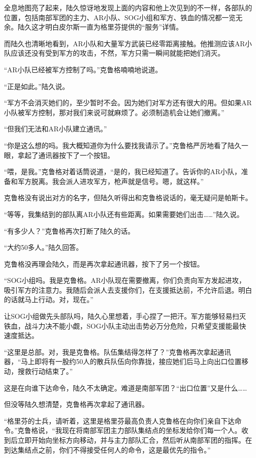全息地图亮了起来，陆久惊讶地发现上面的内容和他上次见到的不一样，各部队的位置，包括南部军团的主力、AR小队、SOG小组和军方、铁血的情况都一览无余。陆久这才明白皮尔斯一直为格里芬提供的“服务”详情。

而陆久也清晰地看到，AR小队和大量军方武装已经零距离接触。他推测应该AR小队应该还没有受到军方的攻击，不然，军方只需一瞬间就能把她们消灭。

“AR小队已经被军方控制了吗。”克鲁格喃喃地说道。

“正是如此。”陆久说。

“军方不会消灭她们的，至少暂时不会。因为她们对军方还有很大的用。但如果AR小队被军方控制，那对我们来说可就麻烦了。必须制造机会让她们撤离。”

“但我们无法和AR小队建立通讯。”

“你是这么想的吗。我大概知道你为什么要找我请示了。”克鲁格严厉地看了陆久一眼，拿起了通讯器按下了一个按钮。

“喂，是我。”克鲁格对着话筒说道，“是的，我已经知道了。告诉你的AR小队，准备和军方脱离。我会派人进攻军方，枪声就是信号。嗯，就这样。”

克鲁格没有说出对方的名字，但陆久听得出和克鲁格说话的，毫无疑问是帕斯卡。

“等等，我集结到的部队离AR小队还有些距离。如果需要她们出击……”陆久说。

“有多少人？”克鲁格再次打断了陆久的话。

“大约50多人。”陆久回答。

克鲁格没再理会陆久，而是再次拿起通讯器，按下了另一个按钮。

“SOG小组吗。我是克鲁格。AR小队现在需要撤离，你们负责向军方发起进攻，吸引军方的注意力。我随后会派人去支援你们，在支援抵达前，不允许后退。明白的话就马上行动。对，现在。”

让SOG小组做先头部队吗，陆久心里想着，手心捏了一把汗。军方能够轻易扫灭铁血，战斗力决不能小觑，SOG小队主动出击势必万分危险，只希望支援能最快速度抵达。

“这里是总部。对，我是克鲁格。队伍集结得怎样了？”克鲁格再次拿起通讯器，“马上即将有一股约50人的散兵队伍向你靠拢，接应她们后马上向出口位置移动，搜救行动结束了。”

这是在向谁下达命令，陆久不太确定。难道是南部军团？“出口位置”又是什么……

但没等陆久想清楚，克鲁格再次拿起了通讯器。

“格里芬的士兵，请听着，这里是格里芬最高负责人克鲁格在向你们亲自下达命令。”克鲁格说，“我现在将南部军团主力部队集结点的坐标发给你们每一个人。收到后立即开始向坐标方向移动，并与主力部队汇合，然后听从南部军团的指挥。在到达集结点之前，你们不得接受任何人的命令，这是最优先的指令。”

